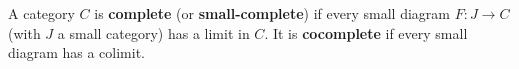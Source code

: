 A category $C$ is \textbf{complete} (or \textbf{small-complete}) if every small diagram $F: J \rightarrow C$ (with $J$ a small category) has a limit in $C$. It is \textbf{cocomplete} if every small diagram has a colimit.